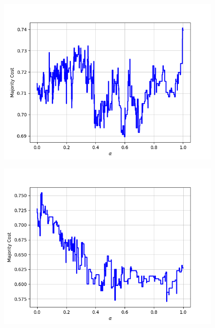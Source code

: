 \begin{figure}[h]
\begin{minipage}{.19\textwidth}
  {\includegraphics[width=\linewidth]{plots/omniglot-intra-ac-cnn/Greek}}
\end{minipage}
\begin{minipage}{.19\textwidth}
  \centering
  {\includegraphics[width=\linewidth]{plots/omniglot-intra-ac-cnn/Gujarati}}
\end{minipage}
\begin{minipage}{.19\textwidth}
  \centering

\end{minipage}
\end{figure}

